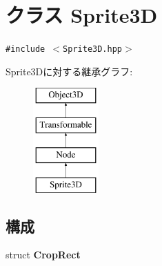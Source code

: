 \hypertarget{classm3g_1_1Sprite3D}{
\section{クラス Sprite3D}
\label{classm3g_1_1Sprite3D}
}
{\tt \#include $<$Sprite3D.hpp$>$}

Sprite3Dに対する継承グラフ:\begin{figure}[H]
\begin{center}
\leavevmode
\includegraphics[height=4cm]{classm3g_1_1Sprite3D}
\end{center}
\end{figure}
\subsection*{構成}
\begin{CompactItemize}
\item 
struct \textbf{CropRect}
\end{CompactItemize}

